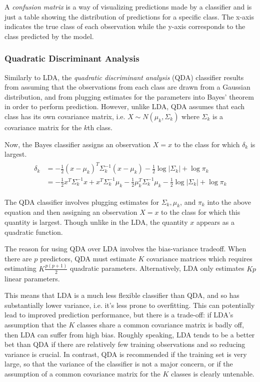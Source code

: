 \documentclass{article}
\numberwithin{equation}{section}
\begin{document}
\begin{enumerate}
 A \textit{confusion matrix} is a way of visualizing predictions made by a classifier and is just a table showing the distribution of predictions for a specific class. The x-axis indicates the true class of each observation while the y-axis corresponds to the class predicted by the model.


\subsubsection{Quadratic Discriminant Analysis}
Similarly to LDA, the \textit{quadratic discriminant analysis} (QDA) classifier results from assuming that the observations from each class are drawn from a Gaussian distribution, and from plugging estimates for the parameters into Bayes’ theorem in order to perform prediction.  However, unlike LDA, QDA assumes that each class has its own covariance matrix, i.e. $X \sim N(\mu_k, \Sigma_k)$ where $\Sigma_k$ is a covariance matrix for the $k$th class.

Now, the Bayes classifier assigns an observation $X = x$ to the class for which $\delta_k$ is largest.
\begin{align}
\begin{split}
    \delta_k &= - \frac{1}{2}(x-\mu_k)^T \Sigma_k^{-1} (x-\mu_k) - \frac{1}{2}\log|\Sigma_k | + \log \pi_k \\
    &= - \frac{1}{2} x^T \Sigma^{-1}_k x + x^T \Sigma^{-1}_k \mu_k - \frac{1}{2} \mu_k^T \Sigma^{-1}_k  \mu_k - \frac{1}{2} \log |\Sigma_k| + \log \pi_k
\end{split}
\end{align}

The QDA classifier involves plugging estimates for $\Sigma_k, \mu_k$, and $\pi_k$ into the above equation and then assigning an observation $X = x$ to the class for which this quantity is largest. Though unlike in the LDA, the quantity $x$ appears as a quadratic function.

The reason for using QDA over LDA involves the bias-variance tradeoff. When
there are $p$ predictors, QDA must estimate $K$ covariance matrices which requires estimating $K \frac{p(p+1)}{2}$ quadratic parameters. Alternatively, LDA only estimates $Kp$ linear parameters. 

This means that LDA is a much less flexible classifier than QDA, and so has substantially lower variance, i.e. it's less prone to overfitting. This can potentially lead to improved prediction performance, but there is a trade-off: if LDA’s assumption that the $K$ classes share a common covariance matrix is badly off, then LDA can suffer from high bias. Roughly speaking, LDA tends to be a better bet than QDA if there are relatively few training observations and so reducing variance is crucial. In contrast, QDA is recommended if the training set is very large, so that the variance of the classifier is not a major concern, or if the assumption of a common covariance matrix for the $K$ classes is clearly untenable.


\end{enumerate}
\end{document}
